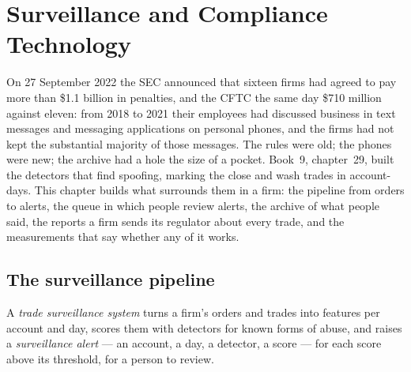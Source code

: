 \chapter{Surveillance and Compliance Technology}\label{ch:pl:surveillance-and-compliance-technology}

On 27 September 2022 the SEC announced that sixteen firms had agreed to pay more than \$1.1 billion in penalties, and the CFTC the same day
\$710 million against eleven: from 2018 to 2021 their employees had discussed business in text messages and messaging applications on personal
phones, and the firms had not kept the substantial majority of those messages. The rules were old; the phones were new; the archive had a
hole the size of a pocket. Book~9, chapter~29, built the detectors that find spoofing, marking the close and wash trades in account-days. This
chapter builds what surrounds them in a firm: the pipeline from orders to alerts, the queue in which people review alerts, the archive of what
people said, the reports a firm sends its regulator about every trade, and the measurements that say whether any of it works.

\section{The surveillance pipeline}

\begin{definition}\label{def:pl:surveillance-and-compliance-technology:system}
A \emph{trade surveillance system} turns a firm's orders and trades into features per account and day, scores
them with detectors for known forms of abuse, and raises a \emph{surveillance alert} --- an account, a day, a
detector, a score --- for each score above its threshold, for a person to review.
\end{definition}

